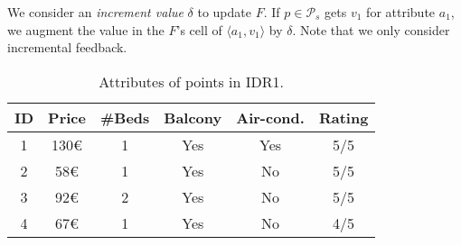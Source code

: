 \vspace{2pt}
We consider an {\em increment value} $\delta$ to update $F$. If $p \in \mathcal{P}_s$ gets $v_1$ for attribute $a_1$, we augment the value in the $F$'s cell of $\langle a_1, v_1 \rangle$ by $\delta$. Note that we only consider incremental feedback.

\begin{table}[]
\centering
\caption{Attributes of points in IDR1.}
\label{tbl:attribs}
\begin{tabular}{|c|c|c|c|c|c|}
\hline
\textbf{ID} & \textbf{Price} & \textbf{\#Beds} & \textbf{Balcony} & \textbf{Air-cond.} & \textbf{Rating} \\ \hline
1                     & 130\euro           & 1               & Yes           & Yes                & 5/5             \\ \hline
2                     & 58\euro            & 1               & Yes           & No                 & 5/5             \\ \hline
3                     & 92\euro            & 2               & Yes           & No                 & 5/5             \\ \hline
4                     & 67\euro            & 1               & Yes           & No                 & 4/5             \\ \hline
\end{tabular}
\end{table}

